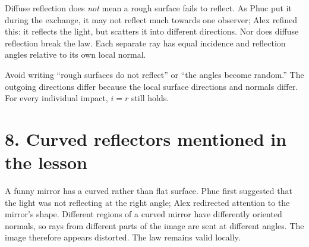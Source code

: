 \documentclass[11pt,a4paper]{article}
\begin{document}
\begin{center}
\end{center}

Diffuse reflection does \emph{not} mean a rough surface fails to reflect. As Phuc put it during the exchange, it may not reflect much towards one observer; Alex refined this: it reflects the light, but scatters it into different directions. Nor does diffuse reflection break the law. Each separate ray has equal incidence and reflection angles relative to its own local normal.

\begin{mistakebox}
Avoid writing ``rough surfaces do not reflect'' or ``the angles become random.'' The outgoing directions differ because the local surface directions and normals differ. For every individual impact, $i=r$ still holds.
\end{mistakebox}

\clearpage
\section*{8. Curved reflectors mentioned in the lesson}
A funny mirror has a curved rather than flat surface. Phuc first suggested that the light was not reflecting at the right angle; Alex redirected attention to the mirror's shape. Different regions of a curved mirror have differently oriented normals, so rays from different parts of the image are sent at different angles. The image therefore appears distorted. The law remains valid locally.
\end{document}

